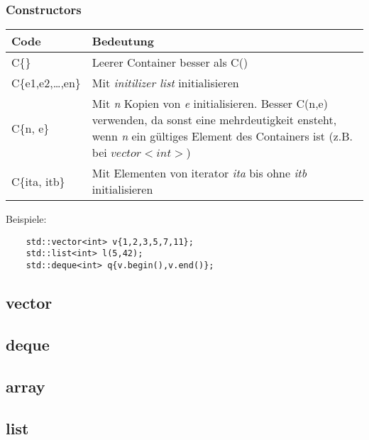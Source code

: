 \subsubsection{Constructors}
	\begin{tabularx}{\columnwidth}{lX}
		Code & Bedeutung \\
		\hline
		C\{\} & Leerer Container besser als C() \\
		C\{e1,e2,\ldots,en\} & Mit \emph{initilizer list} initialisieren \\
		C\{n, e\} & Mit \emph{n} Kopien von \emph{e} initialisieren.  Besser C(n,e) verwenden, da sonst eine mehrdeutigkeit ensteht, wenn \emph{n} ein gültiges Element des Containers ist (z.B. bei $vector<int>$) \\
		C\{ita, itb\} & Mit Elementen von iterator \emph{ita} bis ohne \emph{itb} initialisieren \\
	\end{tabularx}
	Beispiele:
\begin{lstlisting}
	std::vector<int> v{1,2,3,5,7,11};
	std::list<int> l(5,42);
	std::deque<int> q{v.begin(),v.end()};
\end{lstlisting}

\subsection{vector}

\subsection{deque}

\subsection{array}

\subsection{list}

